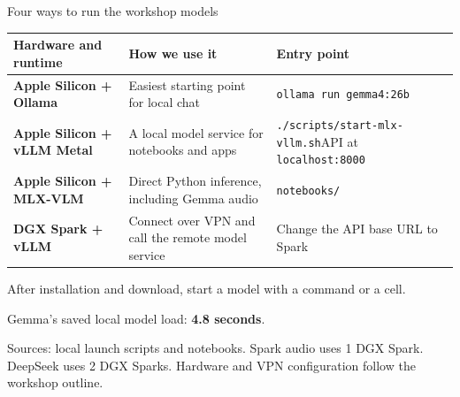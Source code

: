 \documentclass[aspectratio=169,12pt]{beamer}
\newcommand{\source}[1]{\par\vfill{\fontsize{7}{8.5}\selectfont\color{black!65}#1\par}}
\newcommand{\modelid}[1]{{\fontsize{8}{9.5}\selectfont\texttt{#1}}}
\begin{document}
\begin{frame}{Four ways to run the workshop models}
\small
\begin{tabularx}{\textwidth}{@{}>{\raggedright\arraybackslash}p{}Y >{\raggedright\arraybackslash}p{0.27\textwidth}@{}}
\toprule
\textbf{Hardware and runtime} & \textbf{How we use it} & \textbf{Entry point} \\
\midrule
\textbf{Apple Silicon + Ollama} & Easiest starting point for local chat & \modelid{ollama run gemma4:26b} \\
\addlinespace[0.3em]
\textbf{Apple Silicon + vLLM Metal} & A local model service for notebooks and apps & \modelid{./scripts/start-mlx-vllm.sh}\newline API at \modelid{localhost:8000} \\
\addlinespace[0.3em]
\textbf{Apple Silicon + MLX-VLM} & Direct Python inference, including Gemma audio & \modelid{notebooks/}\newline\modelid{local-vlm-gemma.ipynb} \\
\addlinespace[0.3em]
\textbf{DGX Spark + vLLM} & Connect over VPN and call the remote model service & Change the API base URL to Spark \\
\bottomrule
\end{tabularx}
\par\medskip
After installation and download, start a model with a command or a cell.\par
Gemma's saved local model load: \textbf{4.8 seconds}.
\source{Sources: local launch scripts and notebooks. Spark audio uses 1 DGX Spark.
DeepSeek uses 2 DGX Sparks. Hardware and VPN configuration follow the workshop outline.}
\end{frame}
\end{document}
